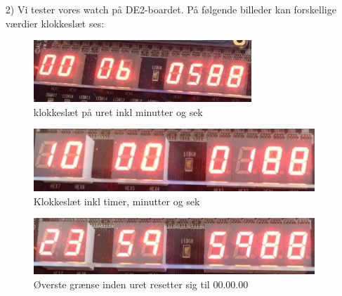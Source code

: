 \begin{enumerate}
\begin{lstlisting}[caption={VHDL code for binary circular watch with 6 digits},label={lst:Watch6digits}]
	\end{lstlisting}
	
	\item[2)] Vi tester vores watch på DE2-boardet. På følgende billeder kan forskellige værdier klokkeslæt ses:
	\begin{figure}[h]
		\centering
		\includegraphics[scale=0.9]{pictures/Oevelse6/opg2/6min.JPG}
		\caption{klokkeslæt på uret inkl minutter og sek}
		\label{fig:alarm0}
		\end{figure}
	\begin{figure}[h]
		\centering
		\includegraphics[scale=0.8]{pictures/Oevelse6/opg2/10timer.JPG}
		\caption{Klokkeslæt inkl timer, minutter og sek}
		\label{fig:alarm0}
	\end{figure}
	\begin{figure}[h]
		\centering
		\includegraphics[scale=0.8]{pictures/Oevelse6/opg2/upper_limit.JPG}
		\caption{Øverste grænse inden uret resetter sig til 00.00.00}
		\label{fig:alarm0}
	\end{figure}
\end{enumerate}